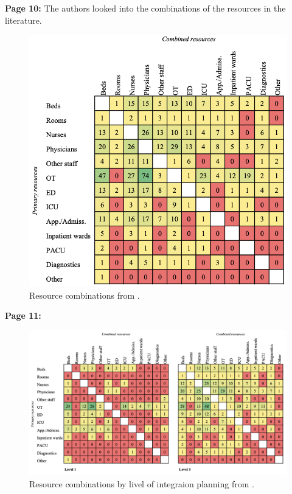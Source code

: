     \textbf{Page 10:}
    The authors looked into the combinations of the resources in the literature.
    \begin{figure}[H]
        \centering
        \includegraphics[width=1\textwidth]{figures/0010_SR02NL23/fig4.png}
        \caption{Resource combinations from \cite{x338}.}
        \label{fig4:0010_SR02NL23}
    \end{figure}

    \textbf{Page 11:}
    \begin{figure}[H]
        \centering
        \includegraphics[width=1\textwidth]{figures/0010_SR02NL23/fig5.png}
        \caption{Resource combinations by livel of integraion planning from \cite{x338}.}
        \label{fig5:0010_SR02NL23}
    \end{figure}
    
